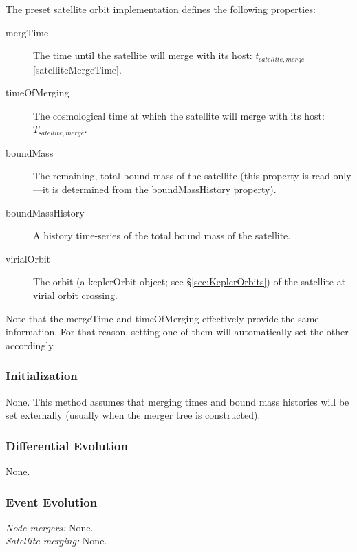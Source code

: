 The preset satellite orbit implementation defines the following properties:
\begin{description}
 \item [{\normalfont \ttfamily mergTime}] The time until the satellite will merge with its host: $t_{\mathrm satellite, merge}$ [{\normalfont \ttfamily satelliteMergeTime}].
 \item [{\normalfont \ttfamily timeOfMerging}] The cosmological time at which the satellite will merge with its host: $T_{\mathrm satellite, merge}$.
 \item [{\normalfont \ttfamily boundMass}] The remaining, total bound mass of the satellite (this property is read only---it is determined from the {\normalfont \ttfamily boundMassHistory} property).
 \item [{\normalfont \ttfamily boundMassHistory}] A history time-series of the total bound mass of the satellite.
 \item [{\normalfont \ttfamily virialOrbit}] The orbit (a {\normalfont \ttfamily keplerOrbit} object; see \S\ref{sec:KeplerOrbits}) of the satellite at virial orbit crossing.
\end{description}

Note that the {\normalfont \ttfamily mergeTime} and {\normalfont \ttfamily timeOfMerging} effectively provide the same information. For that reason, setting one of them will automatically set the other accordingly.

\subsubsection{Initialization}

None. This method assumes that merging times and bound mass histories will be set externally (usually when the merger tree is constructed).

\subsubsection{Differential Evolution}

None.

\subsubsection{Event Evolution}

\noindent\emph{Node mergers:} None.\\

\noindent\emph{Satellite merging:} None.\\

